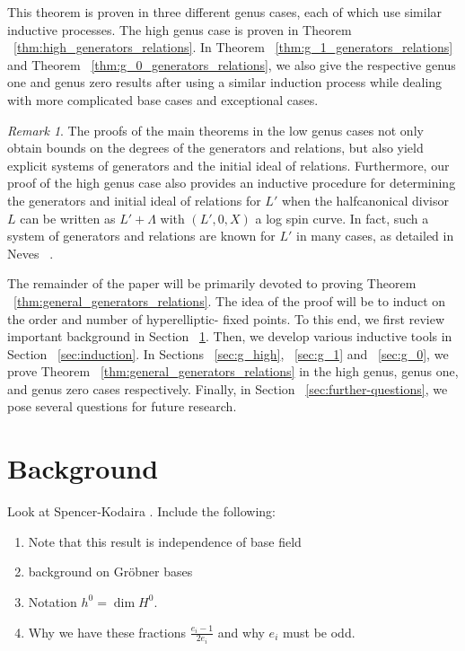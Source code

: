 \documentclass{amsart}
\theoremstyle{plain}
\theoremstyle{definition}
\theoremstyle{remark}
\newtheorem{rem}[thm]{Remark}
\numberwithin{equation}{section}
\newcommand \halfcan{L}
\begin{document}
This theorem is proven in three different genus cases, each of
which use similar inductive processes. The high genus case is
proven in Theorem ~\ref{thm:high_generators_relations}. In Theorem
~\ref{thm:g_1_generators_relations} and Theorem
~\ref{thm:g_0_generators_relations}, we also give the respective
genus one and genus zero results after using a similar induction
process while dealing with more complicated base cases and
exceptional cases.

\begin{rem}
The proofs of the main theorems in the low genus cases not only
obtain bounds on the degrees of the generators and relations, but
also yield explicit systems of generators and the initial ideal of
relations. Furthermore, our proof of the high genus case also
provides an inductive procedure for determining the generators and
initial ideal of relations for $\halfcan'$ when the halfcanonical
divisor $\halfcan$ can be written as $\halfcan' + \Lambda$ with
$(\halfcan', 0, X)$ a log spin curve. In fact, such a system of
generators and relations are known for $\halfcan'$ in many cases,
as detailed in Neves ~\cite[ Section III.4]{neves:halfcan}.
\end{rem}

The remainder of the paper will be primarily devoted to proving
Theorem ~\ref{thm:general_generators_relations}. The idea of the
proof will be to induct on the order and number of hyperelliptic-
fixed points. To this end, we first review important background in
Section ~\ref{sec:background}. Then, we develop various inductive
tools in Section ~\ref{sec:induction}. In Sections ~\ref{sec:g_high},
~\ref{sec:g_1} and ~\ref{sec:g_0}, we prove Theorem
~\ref{thm:general_generators_relations} in the high genus, genus
one, and genus zero cases respectively. Finally, in Section
~\ref{sec:further-questions}, we pose several questions for future
research.


\section{Background}
\label{sec:background}
Look at Spencer-Kodaira \cite{kodaira:complex-manifolds}.
Include the following:
\begin{enumerate}
	\item Note that this result is independence of base field
	\item background on Gr\"{o}bner bases
	\item Notation $h^0 = \dim H^0$.
	\item Why we have these fractions $\frac{e_i - 1}{2e_i}$ and why $e_i$ must be odd.
\end{enumerate}
\end{document}
